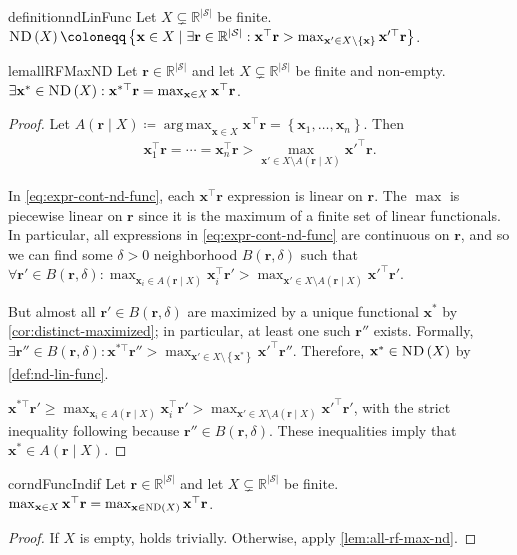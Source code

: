 \documentclass{article}
\renewcommand{\abs}[1]{\left|#1\right|}
\newcommand*{\prn}[1]{\left(#1\right)}
\renewcommand{\set}[1]{\left\{#1\right\}}
\newcommand*{\defeq}{\coloneqq} %
\newcommand*{\x}{\mathbf{x}} %
\newcommand*{\reals}{\mathbb{R}}
\DeclareMathOperator*{\argmax}{arg\,max}
\newcommand*{\upsc}[1]{\text{\upshape\textsc{#1}}}
\newcommand*{\St}{\mathcal{S}}
\newcommand*{\rf}{\mathbf{r}} %
\newcommand*{\rewardVS}{\reals^{\abs{\St}}} %
\newcommand*{\ND}[1]{\upsc{ND}\prn{#1}}
\theoremstyle{definition}
\begin{document}
\begin{appendices}
\begin{restatable}{definition}{ndLinFunc}\label{def:nd-lin-func}
Let $X\subsetneq \rewardVS$ be finite. $\ND{X}\defeq \set{\x\in X\mid \exists \rf \in \rewardVS: \x^\top \rf > \max_{\x'\in X\setminus \set{\x}} \x'^\top \rf}$.
\end{restatable}

\begin{restatable}{lem}{allRFMaxND}\label{lem:all-rf-max-nd}
Let $\rf \in \rewardVS$ and let $X\subsetneq \rewardVS$ be finite and non-empty. $\exists \x^* \in \ND{X}: \x^{*\top}\rf=\max_{\x \in X} \x^\top \rf$.
\end{restatable}
\begin{proof}
Let $A(\rf\mid X)\defeq \argmax_{\x\in X} \x^\top \rf=\set{\x_1,\ldots, \x_n}$. Then 
\begin{align}
    \x_1^\top \rf = \cdots= \x_n^\top \rf> \max_{\x' \in X \setminus A(\rf\mid X)} \x'^\top \rf.\label{eq:expr-cont-nd-func}
\end{align}

In \cref{eq:expr-cont-nd-func}, each $\x^\top \rf$ expression is linear on $\rf$. The $\max$ is piecewise linear on $\rf$ since it is the maximum of a finite set of linear functionals. In particular, all expressions in \cref{eq:expr-cont-nd-func} are continuous on $\rf$, and so we can find some $\delta>0$ neighborhood $B(\rf,\delta)$ such that $\forall \rf' \in B(\rf,\delta): \max_{\x_i\in A(\rf\mid X)} \x_i^\top \rf' > \max_{\x'\in X\setminus A(\rf\mid X)} \x'^\top \rf'$.

But almost all $\rf' \in B(\rf,\delta)$ are maximized by a unique functional $\x^*$ by \cref{cor:distinct-maximized}; in particular, at least one such $\rf''$ exists. Formally, $\exists \rf''\in B(\rf,\delta):\x^{*\top} \rf''>\max_{\x' \in X\setminus \set{\x^*}} \x'^\top \rf''$. Therefore, $\x^*\in \ND{X}$ by \cref{def:nd-lin-func}. 

$\x^{*\top} \rf'\geq\max_{\x_i\in A(\rf\mid X)} \x_i^\top \rf' > \max_{\x'\in X\setminus A(\rf\mid X)} \x'^\top \rf'$, with the strict inequality following because  $\rf'' \in B(\rf,\delta)$. These inequalities imply that $\x^*\in A(\rf\mid X)$.
\end{proof}

\begin{restatable}{cor}{ndFuncIndif}\label{cor:nd-func-indif}
Let $\rf \in \rewardVS$ and let $X\subsetneq \rewardVS$ be finite. $\max_{\x\in X} \x^\top \rf=\max_{\x\in \ND{X}} \x^\top \rf$. 
\end{restatable}
\begin{proof}
If $X$ is empty, holds trivially. Otherwise, apply \cref{lem:all-rf-max-nd}.
\end{proof}


\end{appendices}
\end{document}
